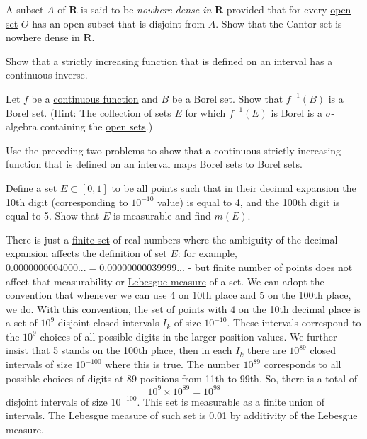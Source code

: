   \begin{exercise}[Royden 2.44]
    A subset $A$ of $\mathbf{R}$ is said to be \emph{nowhere dense in} $\mathbf{R}$ provided that for every \hyperref[pst-def:open-set]{open set} $O$ has an open subset that is disjoint from $A$. Show that the Cantor set is nowhere dense in $\mathbf{R}$.
  \end{exercise}

  \begin{exercise}[Royden 2.45]
    Show that a strictly increasing function that is defined on an interval has a continuous inverse.
  \end{exercise}

  \begin{exercise}[Royden 2.46]
    Let $f$ be a \hyperref[pst-def:continuous_func]{continuous function} and $B$ be a Borel set. Show that $f^{-1}(B)$ is a Borel set. (Hint: The collection of sets $E$ for which $f^{-1}(E)$ is Borel is a $\sigma$-algebra containing the \hyperref[pst-def:open-set]{open sets}.)
  \end{exercise}

  \begin{exercise}[Royden 2.47]
    Use the preceding two problems to show that a continuous strictly increasing function that is defined on an interval maps Borel sets to Borel sets.
  \end{exercise}

  \begin{exercise}
    Define a set $E \subset [0, 1]$ to be all points such that in their decimal expansion the 10th digit (corresponding to $10^{-10}$ value) is equal to 4, and the 100th digit is equal to 5. Show that $E$ is measurable and find $m(E)$.
  \end{exercise}
  \begin{solution}
    There is just a \hyperref[st-def:finite-set]{finite set} of real numbers where the ambiguity of the decimal expansion affects the definition of set $E$: for example, $0.0000000004000... = 0.00000000039999...$ - but finite number of points does not affect that measurability or \hyperref[def:lebesgue-measure]{Lebesgue measure} of a set. We can adopt the convention that whenever we can use 4 on 10th place and 5 on the 100th place, we do. With this convention, the set of points with 4 on the 10th decimal place is a set of $10^9$ disjoint closed intervals $I_k$ of size $10^{-10}$. These intervals correspond to the $10^9$ choices of all possible digits in the larger position values. We further insist that 5 stands on the 100th place, then in each $I_k$ there are $10^{89}$ closed intervals of size $10^{-100}$ where this is true. The number $10^{89}$ corresponds to all possible choices of digits at 89 positions from 11th to 99th. So, there is a total of
    \begin{equation}
      10^9 \times 10^{89} = 10^{98}
    \end{equation}
    disjoint intervals of size $10^{-100}$. This set is measurable as a finite union of intervals. The Lebesgue measure of such set is 0.01 by additivity of the Lebesgue measure.
  \end{solution}

